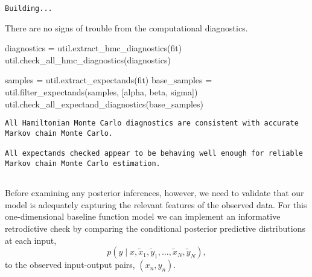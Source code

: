 \documentclass[
  letterpaper,
  DIV=11,
  numbers=noendperiod]{scrartcl}
\newenvironment{Shaded}{\begin{snugshade}}{\end{snugshade}}
\newcommand{\NormalTok}[1]{\textcolor[rgb]{0.00,0.23,0.31}{#1}}
\newcommand{\OperatorTok}[1]{\textcolor[rgb]{0.37,0.37,0.37}{#1}}
\newcommand{\StringTok}[1]{\textcolor[rgb]{0.13,0.47,0.30}{#1}}
\begin{document}
\begin{verbatim}
Building...
\end{verbatim}

There are no signs of trouble from the computational diagnostics.

\begin{Shaded}
\begin{Highlighting}[]
\NormalTok{diagnostics }\OperatorTok{=}\NormalTok{ util.extract\_hmc\_diagnostics(fit)}
\NormalTok{util.check\_all\_hmc\_diagnostics(diagnostics)}

\NormalTok{samples }\OperatorTok{=}\NormalTok{ util.extract\_expectands(fit)}
\NormalTok{base\_samples }\OperatorTok{=}\NormalTok{ util.filter\_expectands(samples,}
\NormalTok{                                      [}\StringTok{\textquotesingle{}alpha\textquotesingle{}}\NormalTok{, }\StringTok{\textquotesingle{}beta\textquotesingle{}}\NormalTok{, }\StringTok{\textquotesingle{}sigma\textquotesingle{}}\NormalTok{])}
\NormalTok{util.check\_all\_expectand\_diagnostics(base\_samples)}
\end{Highlighting}
\end{Shaded}

\begin{verbatim}
All Hamiltonian Monte Carlo diagnostics are consistent with accurate
Markov chain Monte Carlo.
 
All expectands checked appear to be behaving well enough for reliable
Markov chain Monte Carlo estimation.
 
\end{verbatim}

Before examining any posterior inferences, however, we need to validate
that our model is adequately capturing the relevant features of the
observed data. For this one-dimensional baseline function model we can
implement an informative retrodictive check by comparing the conditional
posterior predictive distributions at each input, \[
p(y \mid x,
         \tilde{x}_{1}, \tilde{y}_{1}, \ldots, \tilde{x}_{N}, \tilde{y}_{N}),
\] to the observed input-output pairs, \((x_{n}, y_{n})\).
\end{document}
